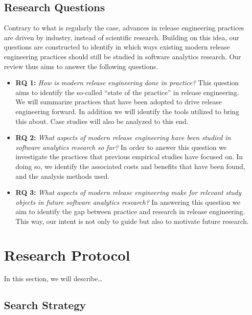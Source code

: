 \documentclass[]{book}
\begin{document}
\subsection{Research Questions}\label{research-questions-1}

Contrary to what is regularly the case, advances in release engineering
practices are driven by industry, instead of scientific research.
Building on this idea, our questions are constructed to identify in
which ways existing modern release engineering practices should still be
studied in software analytics research. Our review thus aims to answer
the following questions.

\begin{itemize}
\item
  \textbf{RQ 1:} \emph{How is modern release engineering done in
  practice?} This question aims to identify the so-called ``state of the
  practice'' in release engineering. We will summarize practices that
  have been adopted to drive release engineering forward. In addition we
  will identify the tools utilized to bring this about. Case studies
  will also be analyzed to this end.
\item
  \textbf{RQ 2:} \emph{What aspects of modern release engineering have
  been studied in software analytics research so far?} In order to
  answer this question we investigate the practices that previous
  empirical studies have focused on. In doing so, we identify the
  associated costs and benefits that have been found, and the analysis
  methods used.
\item
  \textbf{RQ 3:} \emph{What aspects of modern release engineering make
  for relevant study objects in future software analytics research?} In
  answering this question we aim to identify the gap between practice
  and research in release engineering. This way, our intent is not only
  to guide but also to motivate future research.
\end{itemize}

\section{Research Protocol}\label{research-protocol-3}

In this section, we will describe\ldots{}

\subsection{Search Strategy}\label{search-strategy-1}
\end{document}
